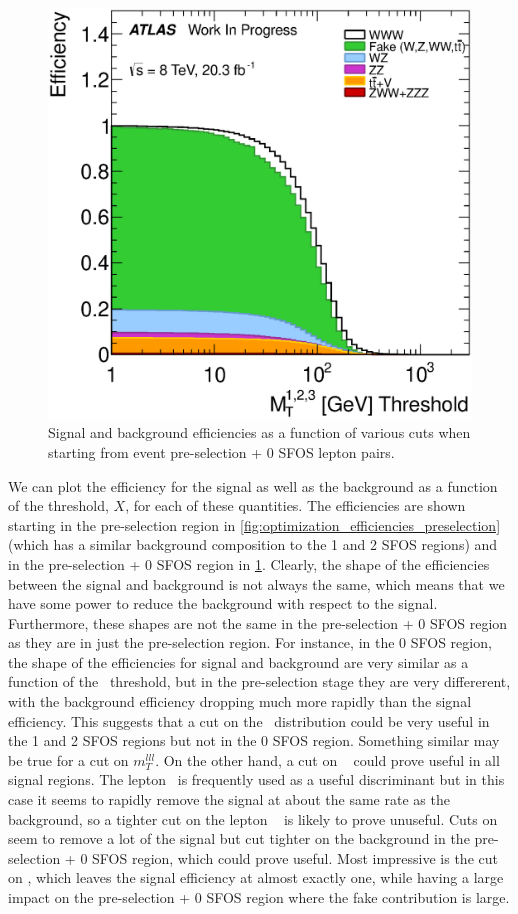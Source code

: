 \begin{figure}[ht!]
\includegraphics[width=0.3\columnwidth]{figures/optimization/SignalRegionsPreselection_0SFOS_Efficiencies/ThreeLeptonMt_Cumulative.eps}
\caption{Signal and background efficiencies as a function of various cuts when starting from event pre-selection + 0 SFOS lepton pairs.}
\label{fig:optimization_efficiencies_0sfos}
\end{figure}

We can plot the efficiency for the signal as well as the background
as a function of the threshold, $X$, for each of these quantities. 
The efficiencies are shown starting 
in the pre-selection region in 
\fig\ref{fig:optimization_efficiencies_preselection} 
(which has a similar background composition to the 1 and 2 SFOS regions)
and in the pre-selection + 0 SFOS region
in \fig\ref{fig:optimization_efficiencies_0sfos}.
Clearly, the shape of the efficiencies between the signal and
background is not always the same, which means that we have some
power to reduce the background with respect to the signal.
Furthermore, these shapes are not the same in the pre-selection 
+ 0 SFOS region as they are in just the pre-selection region.
For instance, in the 0 SFOS region, the shape of the efficiencies
for signal and background are very similar as a function
of the \MET~threshold, but in the pre-selection stage they are
very differerent, with the background efficiency dropping much
more rapidly than the signal efficiency. This suggests that
a cut on the \MET~distribution could be very useful 
in the 1 and 2 SFOS regions but not in the 0 SFOS region.
Something similar may be true for a cut on $m_{T}^{lll}$.
On the other hand, a cut on \deltaphi~ could prove useful in all 
signal regions. The lepton \pt~is frequently used as a useful discriminant
but in this case it seems to rapidly remove the signal at about the
same rate as the background, so a tighter cut on the lepton \pt~
is likely to prove unuseful. Cuts on \njet seem to remove a lot of 
the signal but cut tighter on the background in the pre-selection
+ 0 SFOS region, which could prove useful.  Most impressive is 
the cut on \nbjet, which leaves the signal efficiency at almost exactly
one, while having a large impact on the pre-selection + 0 SFOS region
where the fake contribution is large.

